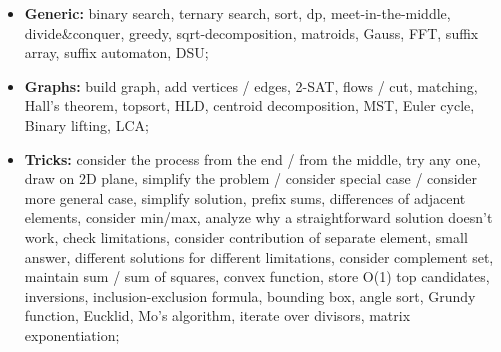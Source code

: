 \begin{itemize}
\item \textbf{Generic:} binary search, ternary search, sort, dp, meet-in-the-middle, divide\&conquer, greedy, sqrt-decomposition, matroids, Gauss, FFT, suffix array, suffix automaton, DSU;
\item \textbf{Graphs:} build graph, add vertices / edges, 2-SAT, flows / cut, matching, Hall's theorem, topsort, HLD, centroid decomposition, MST, Euler cycle, Binary lifting, LCA;
\item \textbf{Tricks:} consider the process from the end / from the middle, try any one, draw on 2D plane, simplify the problem / consider special case / consider more general case, simplify solution, prefix sums, differences of adjacent elements, consider min/max, analyze why a straightforward solution doesn't work, check limitations, consider contribution of separate element, small answer, different solutions for different limitations, consider complement set, maintain sum / sum of squares, convex function, store O(1) top candidates, inversions, inclusion-exclusion formula, bounding box, angle sort, Grundy function, Eucklid, Mo's algorithm, iterate over divisors, matrix exponentiation;
\end{itemize}
